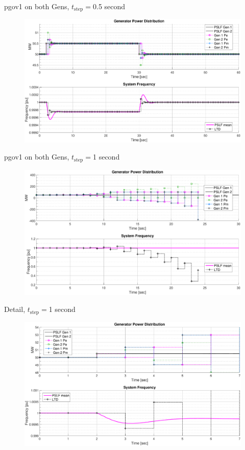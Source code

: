 \documentclass[14pt, unknownkeysallowed]{beamer}
\begin{document}
\begin{frame}
pgov1 on both Gens, $t_\text{step}=$0.5 second
\begin{figure}
	\includegraphics[width=\linewidth]{pgov1TestD}
\end{figure}
\end{frame}
\begin{frame}
pgov1 on both Gens, $t_\text{step}=$1 second
\begin{figure}
	\includegraphics[width=\linewidth]{pgov1TestB}
\end{figure}
\end{frame}
\begin{frame}
Detail, $t_\text{step}=$1 second
\begin{figure}
	\includegraphics[width=\linewidth]{pgov1TestBdetail}
\end{figure}
\end{frame}
\end{document}
